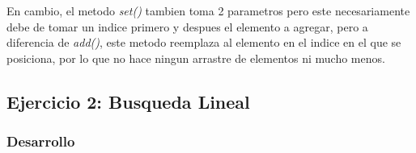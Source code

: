 \documentclass{article}
\begin{document}
			En cambio, el metodo \emph{set()} tambien toma 2 parametros pero este necesariamente debe de tomar un indice primero y despues el elemento a agregar, pero a diferencia de \emph{add()}, este metodo reemplaza al elemento en el indice en el que se posiciona, por lo que no hace ningun arrastre de elementos ni mucho menos.\\

		\subsection{Ejercicio 2: Busqueda Lineal}
		
			\subsubsection{Desarrollo}
				
\end{document}
